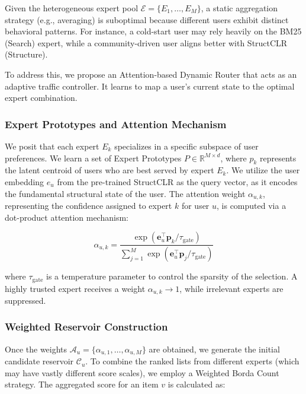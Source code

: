 Given the heterogeneous expert pool $\mathcal{E} = \{ E_{1},\ldots,E_{M}\}$, a static aggregation strategy (e.g., averaging) is suboptimal because different users exhibit distinct behavioral patterns. For instance, a cold-start user may rely heavily on the BM25 (Search) expert, while a community-driven user aligns better with StructCLR (Structure).

To address this, we propose an Attention-based Dynamic Router that acts as an adaptive traffic controller. It learns to map a user's current state to the optimal expert combination.

\subsubsection{Expert Prototypes and Attention Mechanism}

We posit that each expert $E_{k}$ specializes in a specific subspace of user preferences. We learn a set of Expert Prototypes $P \in \mathbb{R}^{M \times d}$, where $p_{k}$ represents the latent centroid of users who are best served by expert $E_{k}$. We utilize the user embedding $e_{u}$ from the pre-trained StructCLR as the query vector, as it encodes the fundamental structural state of the user. The attention weight $\alpha_{u,k}$, representing the confidence assigned to expert $k$ for user $u$, is computed via a dot-product attention mechanism:

\begin{equation}
\alpha_{u,k} = \frac{\exp\left( \mathbf{e}_{u}^{\top}\mathbf{p}_{k}/\tau_{\mathrm{gate}} \right)}{\sum_{j = 1}^{M}\exp\left( \mathbf{e}_{u}^{\top}\mathbf{p}_{j}/\tau_{\mathrm{gate}} \right)}
\end{equation}

where $\tau_{\mathrm{gate}}$ is a temperature parameter to control the sparsity of the selection. A highly trusted expert receives a weight $\alpha_{u,k} \rightarrow 1$, while irrelevant experts are suppressed.

\subsubsection{Weighted Reservoir Construction}

Once the weights $\mathcal{A}_{u} = \{\alpha_{u,1},\ldots,\alpha_{u,M}\}$ are obtained, we generate the initial candidate reservoir $\mathcal{C}_{u}$. To combine the ranked lists from different experts (which may have vastly different score scales), we employ a Weighted Borda Count strategy. The aggregated score for an item $v$ is calculated as:

